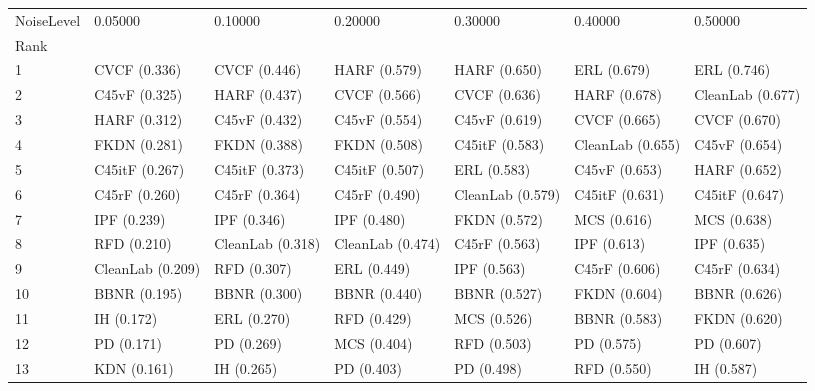 \begin{tabular}{lllllll}
\toprule
NoiseLevel &           0.05000 &           0.10000 &           0.20000 &           0.30000 &           0.40000 &           0.50000 \\
Rank &                   &                   &                   &                   &                   &                   \\
\midrule
1    &      CVCF (0.336) &      CVCF (0.446) &      HARF (0.579) &      HARF (0.650) &       ERL (0.679) &       ERL (0.746) \\
2    &     C45vF (0.325) &      HARF (0.437) &      CVCF (0.566) &      CVCF (0.636) &      HARF (0.678) &  CleanLab (0.677) \\
3    &      HARF (0.312) &     C45vF (0.432) &     C45vF (0.554) &     C45vF (0.619) &      CVCF (0.665) &      CVCF (0.670) \\
4    &      FKDN (0.281) &      FKDN (0.388) &      FKDN (0.508) &    C45itF (0.583) &  CleanLab (0.655) &     C45vF (0.654) \\
5    &    C45itF (0.267) &    C45itF (0.373) &    C45itF (0.507) &       ERL (0.583) &     C45vF (0.653) &      HARF (0.652) \\
6    &     C45rF (0.260) &     C45rF (0.364) &     C45rF (0.490) &  CleanLab (0.579) &    C45itF (0.631) &    C45itF (0.647) \\
7    &       IPF (0.239) &       IPF (0.346) &       IPF (0.480) &      FKDN (0.572) &       MCS (0.616) &       MCS (0.638) \\
8    &       RFD (0.210) &  CleanLab (0.318) &  CleanLab (0.474) &     C45rF (0.563) &       IPF (0.613) &       IPF (0.635) \\
9    &  CleanLab (0.209) &       RFD (0.307) &       ERL (0.449) &       IPF (0.563) &     C45rF (0.606) &     C45rF (0.634) \\
10   &      BBNR (0.195) &      BBNR (0.300) &      BBNR (0.440) &      BBNR (0.527) &      FKDN (0.604) &      BBNR (0.626) \\
11   &        IH (0.172) &       ERL (0.270) &       RFD (0.429) &       MCS (0.526) &      BBNR (0.583) &      FKDN (0.620) \\
12   &        PD (0.171) &        PD (0.269) &       MCS (0.404) &       RFD (0.503) &        PD (0.575) &        PD (0.607) \\
13   &       KDN (0.161) &        IH (0.265) &        PD (0.403) &        PD (0.498) &       RFD (0.550) &        IH (0.587) \\

\end{tabular}
